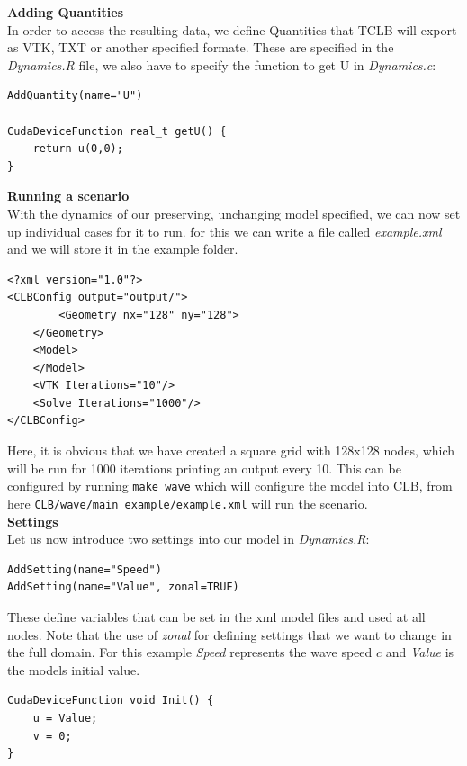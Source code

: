 \documentclass[12pt,a4paper]{report}
\begin{document}
\textbf{Adding Quantities} \\
In order to access the resulting data, we define Quantities that TCLB will export as VTK, TXT or another specified formate. These are specified in the \textit{Dynamics.R} file, we also have to specify the function to get U in \textit{Dynamics.c}:
\begin{lstlisting}
AddQuantity(name="U")

CudaDeviceFunction real_t getU() {
	return u(0,0);
}
\end{lstlisting}

\textbf{Running a scenario} \\
With the dynamics of our preserving, unchanging model specified, we can now set up individual cases for it to run. for this we can write a file called \textit{example.xml} and we will store it in the example folder.
\begin{lstlisting}
<?xml version="1.0"?>
<CLBConfig output="output/">
        <Geometry nx="128" ny="128">
    </Geometry>
    <Model>
    </Model>
    <VTK Iterations="10"/>
    <Solve Iterations="1000"/>
</CLBConfig>
\end{lstlisting}
Here, it is obvious that we have created a square grid with 128x128 nodes, which will be run for 1000 iterations printing an output every 10. This can be configured by running \lstinline$make wave$ which will configure the model into CLB, from here \lstinline$CLB/wave/main example/example.xml$ will run the scenario. \\

\textbf{Settings}\\
Let us now introduce two settings into our model in \textit{Dynamics.R}:
\begin{lstlisting}
AddSetting(name="Speed")
AddSetting(name="Value", zonal=TRUE)
\end{lstlisting}

These define variables that can be set in the xml model files and used at all nodes. Note that the use of \textit{zonal} for defining settings that we want to change in the full domain. For this example \textit{Speed} represents the wave speed $c$ and \textit{Value} is the models initial value.
\begin{lstlisting}
CudaDeviceFunction void Init() {
	u = Value;
	v = 0;
}
\end{lstlisting}
\end{document}
